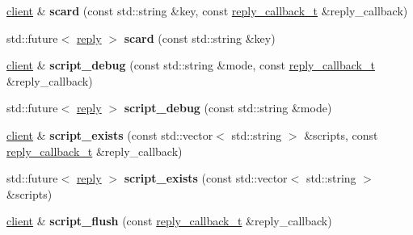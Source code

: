 \begin{DoxyCompactItemize}
\item 
\mbox{\label{classcpp__redis_1_1client_a4be40b061ee915a236218e5e2fd76206}} 
\hyperlink{classcpp__redis_1_1client}{client} \& {\bfseries scard} (const std\+::string \&key, const \hyperlink{classcpp__redis_1_1client_a061a1140d36d2eaeda82b09a0bb3f9f2}{reply\+\_\+callback\+\_\+t} \&reply\+\_\+callback)
\item 
\mbox{\label{classcpp__redis_1_1client_a089148ca908f563e7b73649aac3bd01e}} 
std\+::future$<$ \hyperlink{classcpp__redis_1_1reply}{reply} $>$ {\bfseries scard} (const std\+::string \&key)
\item 
\mbox{\label{classcpp__redis_1_1client_a6e83ee14e50aef360d7246c2da63b037}} 
\hyperlink{classcpp__redis_1_1client}{client} \& {\bfseries script\+\_\+debug} (const std\+::string \&mode, const \hyperlink{classcpp__redis_1_1client_a061a1140d36d2eaeda82b09a0bb3f9f2}{reply\+\_\+callback\+\_\+t} \&reply\+\_\+callback)
\item 
\mbox{\label{classcpp__redis_1_1client_a336d8dd0da70700d67bac5e71484efff}} 
std\+::future$<$ \hyperlink{classcpp__redis_1_1reply}{reply} $>$ {\bfseries script\+\_\+debug} (const std\+::string \&mode)
\item 
\mbox{\label{classcpp__redis_1_1client_a6fcb8af437a9ae919af745cd0a0fa313}} 
\hyperlink{classcpp__redis_1_1client}{client} \& {\bfseries script\+\_\+exists} (const std\+::vector$<$ std\+::string $>$ \&scripts, const \hyperlink{classcpp__redis_1_1client_a061a1140d36d2eaeda82b09a0bb3f9f2}{reply\+\_\+callback\+\_\+t} \&reply\+\_\+callback)
\item 
\mbox{\label{classcpp__redis_1_1client_ab55eac91086b7746d731c8405f901016}} 
std\+::future$<$ \hyperlink{classcpp__redis_1_1reply}{reply} $>$ {\bfseries script\+\_\+exists} (const std\+::vector$<$ std\+::string $>$ \&scripts)
\item 
\mbox{\label{classcpp__redis_1_1client_a6d885c8b61bfbb74245be8d040813637}} 
\hyperlink{classcpp__redis_1_1client}{client} \& {\bfseries script\+\_\+flush} (const \hyperlink{classcpp__redis_1_1client_a061a1140d36d2eaeda82b09a0bb3f9f2}{reply\+\_\+callback\+\_\+t} \&reply\+\_\+callback)

\end{DoxyCompactItemize}
